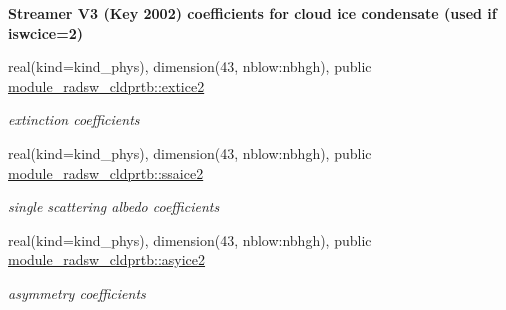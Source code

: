 \begin{Indent}\textbf{ Streamer V3 (Key 2002) coefficients for cloud ice condensate (used if iswcice=2)}\par
\begin{DoxyCompactItemize}
\item 
\mbox{\label{namespacemodule__radsw__cldprtb_a8ed403302034ea073243157749673e14}} 
real(kind=kind\+\_\+phys), dimension(43, nblow\+:nbhgh), public \hyperlink{namespacemodule__radsw__cldprtb_a8ed403302034ea073243157749673e14}{module\+\_\+radsw\+\_\+cldprtb\+::extice2}
\begin{DoxyCompactList}\small\item\em extinction coefficients \end{DoxyCompactList}\item 
\mbox{\label{namespacemodule__radsw__cldprtb_a48555ff54d3a46f8c49733ff82e94d70}} 
real(kind=kind\+\_\+phys), dimension(43, nblow\+:nbhgh), public \hyperlink{namespacemodule__radsw__cldprtb_a48555ff54d3a46f8c49733ff82e94d70}{module\+\_\+radsw\+\_\+cldprtb\+::ssaice2}
\begin{DoxyCompactList}\small\item\em single scattering albedo coefficients \end{DoxyCompactList}\item 
\mbox{\label{namespacemodule__radsw__cldprtb_ad9328ffc5e90cc62c8c9c5089b55fc79}} 
real(kind=kind\+\_\+phys), dimension(43, nblow\+:nbhgh), public \hyperlink{namespacemodule__radsw__cldprtb_ad9328ffc5e90cc62c8c9c5089b55fc79}{module\+\_\+radsw\+\_\+cldprtb\+::asyice2}
\begin{DoxyCompactList}\small\item\em asymmetry coefficients \end{DoxyCompactList}\end{DoxyCompactItemize}
\end{Indent}
